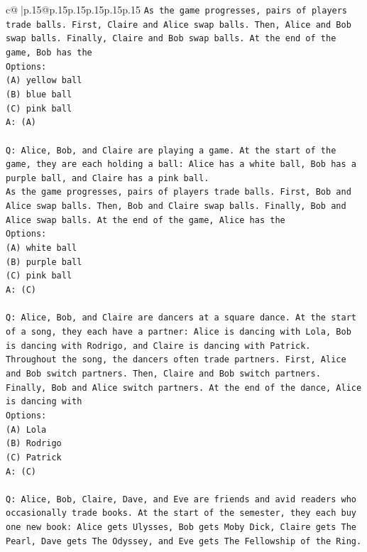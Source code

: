 \documentclass{article}
\begin{document}
{\begin{supertabular}{c@{$\;$}|p{.15\linewidth}@{}p{.15\linewidth}p{.15\linewidth}p{.15\linewidth}p{.15\linewidth}p{.15\linewidth}}
{{{\texttt{As the game progresses, pairs of players trade balls. First, Claire and Alice swap balls. Then, Alice and Bob swap balls. Finally, Claire and Bob swap balls. At the end of the game, Bob has the} \\
\texttt{Options:} \\
\texttt{(A) yellow ball} \\
\texttt{(B) blue ball} \\
\texttt{(C) pink ball} \\
\texttt{A: (A)} \\
\\ 
\texttt{Q: Alice, Bob, and Claire are playing a game. At the start of the game, they are each holding a ball: Alice has a white ball, Bob has a purple ball, and Claire has a pink ball.} \\
\texttt{As the game progresses, pairs of players trade balls. First, Bob and Alice swap balls. Then, Bob and Claire swap balls. Finally, Bob and Alice swap balls. At the end of the game, Alice has the} \\
\texttt{Options:} \\
\texttt{(A) white ball} \\
\texttt{(B) purple ball} \\
\texttt{(C) pink ball} \\
\texttt{A: (C)} \\
\\ 
\texttt{Q: Alice, Bob, and Claire are dancers at a square dance. At the start of a song, they each have a partner: Alice is dancing with Lola, Bob is dancing with Rodrigo, and Claire is dancing with Patrick.} \\
\texttt{Throughout the song, the dancers often trade partners. First, Alice and Bob switch partners. Then, Claire and Bob switch partners. Finally, Bob and Alice switch partners. At the end of the dance, Alice is dancing with} \\
\texttt{Options:} \\
\texttt{(A) Lola} \\
\texttt{(B) Rodrigo} \\
\texttt{(C) Patrick} \\
\texttt{A: (C)} \\
\\ 
\texttt{Q: Alice, Bob, Claire, Dave, and Eve are friends and avid readers who occasionally trade books. At the start of the semester, they each buy one new book: Alice gets Ulysses, Bob gets Moby Dick, Claire gets The Pearl, Dave gets The Odyssey, and Eve gets The Fellowship of the Ring.} \\
}}}
\end{supertabular}}
\end{document}
